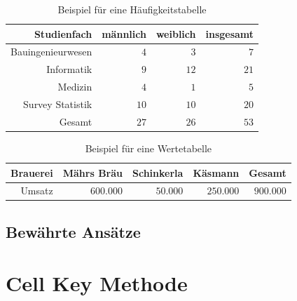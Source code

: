 \begin{table}[h]
    \centering
    \begin{tabular}{ r r r r }
        \textbf{Studienfach} \vline & \textbf{männlich} & \textbf{weiblich} & \textbf{insgesamt} \\ 
        \hline
        Bauingenieurwesen \vline & $4$ & $3$ & $7$ \\
        Informatik \vline & $9$ & $12$ & $21$ \\  
        Medizin \vline & $4$ & $1$ & $5$ \\
        Survey Statistik \vline & $10$ & $10$ & $20$ \\
        \hline
        Gesamt \vline & $27$ & $26$ & $53$
    \end{tabular}
    \caption{Beispiel für eine Häufigkeitstabelle}
\end{table}

\begin{table}[h]
    \centering
    \begin{tabular}{ r r r r r }
        \textbf{Brauerei} \vline & \textbf{Mährs Bräu} & \textbf{Schinkerla} & \textbf{Käsmann} & \textbf{Gesamt} \\ 
        \hline
        Umsatz \vline & $600.000$ & $50.000$ & $250.000$ & $900.000$
        \end{tabular}
    \caption{Beispiel für eine Wertetabelle}
\end{table}


\subsection{Bewährte Ansätze}




\section{Cell Key Methode}

